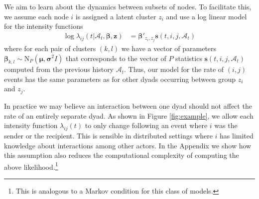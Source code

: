 \documentclass{article}
\begin{document}
%   


We aim to learn about the dynamics between subsets of nodes.   To facilitate this, we assume each node $i$ is assigned a latent cluster $z_i$ and use a log linear model for the intensity functions
\begin{align*}
\log \lambda_{ij}(t | \mathcal{A}_t,\mathbf{\beta},\mathbf{z}) &= \boldsymbol{\beta}'_{z_i,z_j} \mathbf{s}(t,i,j,\mathcal{A}_t)
\end{align*}
where for each pair of clusters $(k,l)$ we have a vector of parameters $\boldsymbol{\beta}_{k,l} \sim \mbox{N}_P(\boldsymbol{\mu},\boldsymbol{\sigma}^2I)$ that corresponds to the vector of $P$ statistics $\mathbf{s}(t,i,j,\mathcal{A}_t)$ computed from the previous history $\mathcal{A}_t$.  Thus, our model for the rate of $(i,j)$ events has the same parameters as for other dyads occurring between group $z_i$ and $z_j$.  

 In practice we may believe an interaction between one dyad should not affect the rate of an entirely separate dyad.  As shown in Figure \ref{fig:example}, we allow each intensity function $\lambda_{ij}(t)$ to only change following an event where $i$ was the sender or the recipient.  This is sensible in distributed settings where $i$ has limited knowledge about interactions among other actors.  In the Appendix we show how this assumption also reduces the computational complexity of computing the above likelihood.\footnote{This is analogous to a Markov condition for this class of models.}
\end{document}
